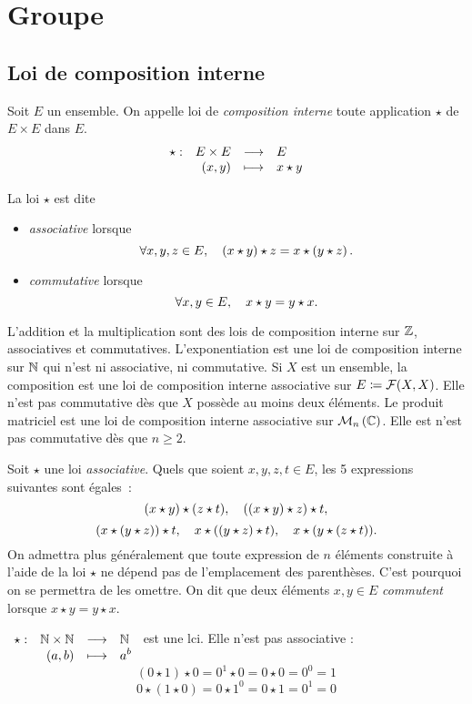 \documentclass{magnolia}
\begin{document}
\magtoc

\section{Groupe}
\subsection{Loi de composition interne}

\begin{definition}
Soit $E$ un ensemble. On appelle loi de \emph{composition interne} toute
application $\star$ de $E\times E$ dans $E$.
\[\begin{array}[t]{lrcl} \displaystyle{\star} : & \displaystyle{E\times E} & \longrightarrow & \displaystyle{E} \\ & \displaystyle{\left(x,y\right)} & \longmapsto & \displaystyle{x\star y} \end{array}\]
\end{definition}

\begin{definition}
La loi $\star$ est dite
\begin{itemize}
\item \emph{associative} lorsque
  \[\forall x,y,z\in E ,\quad \left(x\star y\right)\star z=x\star\left(y\star z\right).\]
\item \emph{commutative} lorsque
  \[\forall x,y\in E ,\quad x\star y=y\star x.\]
\end{itemize}
\end{definition}

\begin{exemples}
\exemple L'addition et la multiplication sont des lois de composition interne sur $\mathbb{Z}$,
  associatives et commutatives.
\exemple L'exponentiation est une loi de composition interne sur $\mathbb{N}$ qui n'est
  ni associative, ni commutative.
\exemple Si $X$ est un ensemble, la composition est une loi de composition interne
  associative sur $E\coloneqq\mathcal{F}(X,X)$. Elle n'est pas commutative dès que $X$ possède
  au moins deux éléments.
\exemple Le produit matriciel est une loi de composition interne associative sur
  $\mathcal{M}_{n}\left(\mathbb{C}\right)$. Elle est n'est pas commutative dès que $n\geq 2$.
\end{exemples}

\begin{remarques}
\remarque Soit $\star$ une loi \emph{associative}.
  Quels que soient $x, y, z, t\in E$, les 5 expressions
  suivantes sont égales~:
  \[(x\star y)\star(z\star t),\quad ((x\star y)\star z)\star t,\]
  \[(x\star(y\star z))\star t,\quad
    x\star((y\star z)\star t),\quad
    x\star(y\star(z\star t)).\]
  On admettra plus généralement que
  toute expression de $n$ éléments construite à l'aide de la loi $\star$ ne dépend
  pas de l'emplacement des parenthèses. C'est pourquoi on se permettra de les omettre.
\remarque On dit que deux éléments $x,y\in E$ \emph{commutent} lorsque $x\star y=y\star x$.
\end{remarques}
\begin{sol}
$\begin{array}[t]{lrcl} \displaystyle{\star} : & \displaystyle{\mathbb{N}\times\mathbb{N}} & \longrightarrow & \displaystyle{\mathbb{N}} \\ & \displaystyle{(a,b)} & \longmapsto & \displaystyle{a^b} \end{array}$ est une lci. Elle n'est pas associative :
$$(0\star 1)\star 0= 0^1 \star 0=0\star 0=0^0=1$$
$$0\star (1\star 0)=0\star 1^0=0\star 1=0^1=0$$
\end{sol}
\end{document}
